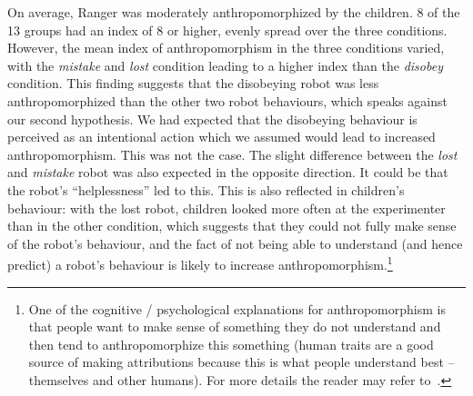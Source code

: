 \documentclass{sig-alternate}
\begin{document}
On average, Ranger was moderately anthropomorphized by the children. 8 of the 13
groups had an index of 8 or higher, evenly spread over the three conditions.
However, the mean index of anthropomorphism in the three conditions varied, with
the \textit{mistake} and \textit{lost} condition leading to a higher index than
the \textit{disobey} condition. This finding suggests that the disobeying robot
was less anthropomorphized than the other two robot behaviours, which speaks
against our second hypothesis. We had expected that the disobeying behaviour is
perceived as an intentional action which we assumed would lead to increased
anthropomorphism. This was not the case. The slight difference between the
\textit{lost} and \textit{mistake} robot was also expected in the opposite
direction. It could be that the robot's ``helplessness'' led to this. This is
also reflected in children's behaviour: with the lost robot, children looked
more often at the experimenter than in the other condition, which suggests that
they could not fully make sense of the robot's behaviour, and the fact of not
being able to understand (and hence predict) a robot's behaviour is likely to
increase anthropomorphism.\footnote{One of the cognitive / psychological
explanations for anthropomorphism is that people want to make sense of
something they do not understand and then tend to anthropomorphize this
something (human traits are a good source of making attributions because
this is what people understand best -- themselves and other humans). For
more details the reader may refer to~\cite{epley_seeing_2007}.}
%
%
%
\end{document}
